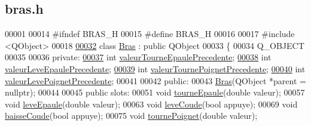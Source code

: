 \hypertarget{bras_8h_source}{}\subsection{bras.\+h}

\begin{DoxyCode}
00001 
00014 \textcolor{preprocessor}{#ifndef BRAS\_H}
00015 \textcolor{preprocessor}{#define BRAS\_H}
00016 
00017 \textcolor{preprocessor}{#include <QObject>}
00018 
\hyperlink{class_bras}{00032} \textcolor{keyword}{class }\hyperlink{class_bras}{Bras} : \textcolor{keyword}{public} QObject
00033 \{
00034     Q\_OBJECT
00035 
00036     \textcolor{keyword}{private}:
\hyperlink{class_bras_a7108c10b4e8f6ceb1ffb7543aeac55e1}{00037}         \textcolor{keywordtype}{int} \hyperlink{class_bras_a7108c10b4e8f6ceb1ffb7543aeac55e1}{valeurTourneEpaulePrecedente}; 
\hyperlink{class_bras_ab9045906376dd797febdcb5956b155c1}{00038}         \textcolor{keywordtype}{int} \hyperlink{class_bras_ab9045906376dd797febdcb5956b155c1}{valeurLeveEpaulePrecedente};   
\hyperlink{class_bras_aee3f364c582bb94e49be07f4f28c5ba4}{00039}         \textcolor{keywordtype}{int} \hyperlink{class_bras_aee3f364c582bb94e49be07f4f28c5ba4}{valeurTournePoignetPrecedente};
\hyperlink{class_bras_a83bd1b995ba642e336c24151ba4964cf}{00040}         \textcolor{keywordtype}{int} \hyperlink{class_bras_a83bd1b995ba642e336c24151ba4964cf}{valeurLevePoignetPrecedente};  
00041 
00042     \textcolor{keyword}{public}:
00043         \hyperlink{class_bras_aa194e94737e1e024e7f9a0cd6ecb6594}{Bras}(QObject *parent = \textcolor{keyword}{nullptr});
00044 
00045     \textcolor{keyword}{public} slots:
00051         \textcolor{keywordtype}{void} \hyperlink{class_bras_aaeacb18f22532a63559fc8430118169e}{tourneEpaule}(\textcolor{keywordtype}{double} valeur);
00057         \textcolor{keywordtype}{void} \hyperlink{class_bras_ac8f658db87d03bfbba6faa535326cc3a}{leveEpaule}(\textcolor{keywordtype}{double} valeur);
00063         \textcolor{keywordtype}{void} \hyperlink{class_bras_a197686a4ff55b4fe2384b2af44b8228b}{leveCoude}(\textcolor{keywordtype}{bool} appuye);
00069         \textcolor{keywordtype}{void} \hyperlink{class_bras_a4b8e4791a454fcf884b1e7217a16a326}{baisseCoude}(\textcolor{keywordtype}{bool} appuye);
00075         \textcolor{keywordtype}{void} \hyperlink{class_bras_a15beae8aa104c2e689614486646ab402}{tournePoignet}(\textcolor{keywordtype}{double} valeur);

\end{DoxyCode}
